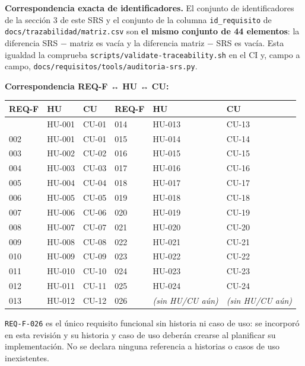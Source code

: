 \documentclass[
  spanish,
]{article}
\newcounter{none} %
\begin{document}
\textbf{Correspondencia exacta de identificadores.} El conjunto de
identificadores de la sección 3 de este SRS y el conjunto de la columna
\texttt{id\_\allowbreak{}requisito} de \texttt{docs/\allowbreak{}trazabilidad/\allowbreak{}matriz.\allowbreak{}csv} son
\textbf{el mismo conjunto de 44 elementos}: la diferencia SRS − matriz
es vacía y la diferencia matriz − SRS es vacía. Esta igualdad la
comprueba \texttt{scripts/\allowbreak{}validate-\allowbreak{}traceability.\allowbreak{}sh} en el CI y, campo a
campo, \texttt{docs/\allowbreak{}requisitos/\allowbreak{}tools/\allowbreak{}auditoria-\allowbreak{}srs.\allowbreak{}py}.

\textbf{Correspondencia REQ-F ↔ HU ↔ CU:}

{\def\LTcaptype{none} %
\begin{longtable}[]{@{}llllll@{}}
\toprule\noalign{}
REQ-F & HU & CU & REQ-F & HU & CU \\
\midrule\noalign{}
\endhead
\bottomrule\noalign{}
\endlastfoot
001 & HU-001 & CU-01 & 014 & HU-013 & CU-13 \\
002 & HU-001 & CU-01 & 015 & HU-014 & CU-14 \\
003 & HU-002 & CU-02 & 016 & HU-015 & CU-15 \\
004 & HU-003 & CU-03 & 017 & HU-016 & CU-16 \\
005 & HU-004 & CU-04 & 018 & HU-017 & CU-17 \\
006 & HU-005 & CU-05 & 019 & HU-018 & CU-18 \\
007 & HU-006 & CU-06 & 020 & HU-019 & CU-19 \\
008 & HU-007 & CU-07 & 021 & HU-020 & CU-20 \\
009 & HU-008 & CU-08 & 022 & HU-021 & CU-21 \\
010 & HU-009 & CU-09 & 023 & HU-022 & CU-22 \\
011 & HU-010 & CU-10 & 024 & HU-023 & CU-23 \\
012 & HU-011 & CU-11 & 025 & HU-024 & CU-24 \\
013 & HU-012 & CU-12 & 026 & \emph{(sin HU/CU aún)} & \emph{(sin HU/CU
aún)} \\
\end{longtable}
}

\texttt{REQ-\allowbreak{}F-\allowbreak{}026} es el único requisito funcional sin historia ni caso
de uso: se incorporó en esta revisión y su historia y caso de uso
deberán crearse al planificar su implementación. No se declara ninguna
referencia a historias o casos de uso inexistentes.
\end{document}
